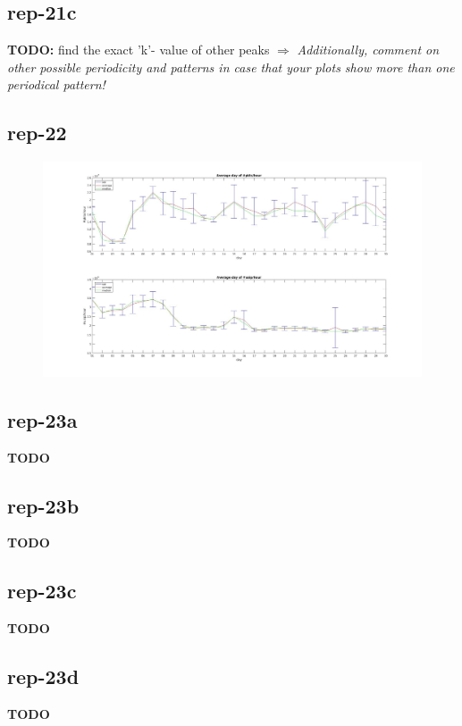 \subsection*{rep-21c}
\textbf{TODO:} find the exact 'k'- value of other peaks $\Rightarrow$ \textit{Additionally, comment on other possible periodicity and patterns in case that your plots show more than one periodical pattern!}
\subsection*{rep-22}
\begin{figure}[H]
\center
\includegraphics[width=1\textwidth]{./chapters/plots/rep-22.jpg}\\
\caption{}
\end{figure}

\subsection*{rep-23a}
\textbf{TODO}
\subsection*{rep-23b}
\textbf{TODO}
\subsection*{rep-23c}
\textbf{TODO}
\subsection*{rep-23d}
\textbf{TODO}
